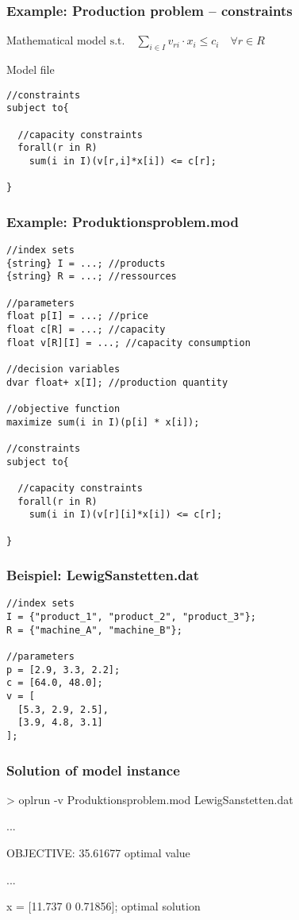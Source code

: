 \begin{frame}[fragile]\small
 \frametitle{Example: Production problem -- constraints}
 \begin{block}{Mathematical model}
  $\text{s.t.}\quad\displaystyle\sum_{i\in I} v_{ri}\cdot x_i \leq c_i  \quad\forall r\in R$
 \end{block}
 \begin{block}{Model file}\scriptsize
\begin{lstlisting}[numbers=none]
//constraints
subject to{
  
  //capacity constraints
  forall(r in R)
    sum(i in I)(v[r,i]*x[i]) <= c[r];
  
}  
\end{lstlisting}
 \end{block}
\end{frame}

\begin{frame}[fragile]
 \frametitle{Example: Produktionsproblem.mod}
 \medskip
\begin{lstlisting}[basicstyle=\scriptsize\ttfamily]
//index sets
{string} I = ...; //products
{string} R = ...; //ressources

//parameters
float p[I] = ...; //price
float c[R] = ...; //capacity
float v[R][I] = ...; //capacity consumption

//decision variables
dvar float+ x[I]; //production quantity

//objective function
maximize sum(i in I)(p[i] * x[i]);

//constraints
subject to{
  
  //capacity constraints
  forall(r in R)
    sum(i in I)(v[r][i]*x[i]) <= c[r];
  
}   
\end{lstlisting}
\end{frame}

\begin{frame}[fragile]
 \frametitle{Beispiel: LewigSanstetten.dat}
 \medskip
\begin{lstlisting}[basicstyle=\scriptsize\ttfamily]
//index sets
I = {"product_1", "product_2", "product_3"}; 
R = {"machine_A", "machine_B"}; 
 
//parameters
p = [2.9, 3.3, 2.2];
c = [64.0, 48.0];
v = [
  [5.3, 2.9, 2.5],
  [3.9, 4.8, 3.1]
]; 
\end{lstlisting}
\end{frame}

\begin{frame}
 \frametitle{Solution of model instance}
 \ttfamily
 > oplrun -v Produktionsproblem.mod LewigSanstetten.dat
 \begin{center}
  \textsf ...
 \end{center}
 OBJECTIVE: 35.61677 \hfill\alert{\textsf{\textleftarrow{} optimal value}}
 \begin{center}
  \textsf ...
 \end{center}
 x = [11.737 0 0.71856]; \hfill\alert{\textsf{\textleftarrow{} optimal solution}}
\end{frame}
